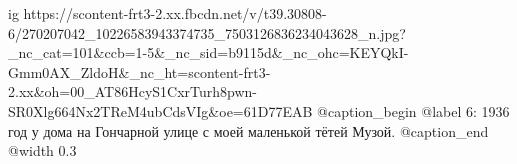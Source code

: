  
 
 
 
 

\ifcmt
  ig https://scontent-frt3-2.xx.fbcdn.net/v/t39.30808-6/270207042_10226583943374735_7503126836234043628_n.jpg?_nc_cat=101&ccb=1-5&_nc_sid=b9115d&_nc_ohc=KEYQkI-Gmm0AX_ZldoH&_nc_ht=scontent-frt3-2.xx&oh=00_AT86HcyS1CxrTurh8pwn-SR0Xlg664Nx2TReM4ubCdsVIg&oe=61D77EAB
	@caption_begin
	  @label 6:
		1936 год у дома на Гончарной улице с моей маленькой тётей Музой.
	@caption_end
  @width 0.3
\fi
